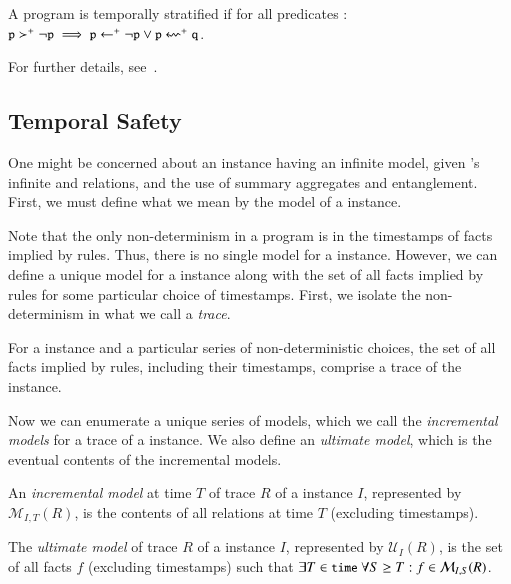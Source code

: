 \begin{definition}
%
A \lang program is temporally stratified if for all predicates :
$\dedalus{p} \succ^+ \lnot \dedalus{p} \implies \dedalus{p} \gets^+ \lnot
\dedalus{p} \lor \dedalus{p} \leftsquigarrow^+ \dedalus{q}$.
%
\end{definition}

For further details, see~\cite{dedalus-techr}.

\subsection{Temporal Safety}

One might be concerned about an instance having an infinite model, given \lang's
infinite  and  relations, and the use of
summary aggregates and entanglement.  First, we must define what we mean by the
model of a \lang instance.

Note that the only non-determinism in a \lang program is in the timestamps of
facts implied by  rules.  Thus, there is no single model for a
\lang instance.  However, we can define a unique model for a \lang instance
along with the set of all facts implied by  rules for some
particular choice of timestamps.  First, we isolate the non-determinism in what
we call a {\em trace}.

\begin{definition}
%
For a \lang instance and a particular series of non-deterministic choices, the
set of all facts implied by  rules, including their timestamps,
comprise a trace of the instance.
%
\end{definition}

Now we can enumerate a unique series of models, which we call the {\em incremental
models} for a trace of a \lang instance.  We also define an {\em ultimate
model}, which is the eventual contents of the incremental models.

\begin{definition}
%
An {\em incremental model} at time $T$ of trace $R$ of a \lang instance $I$,
represented by $\mathcal{M}_{I,T}(R)$, is the contents of all
relations at time $T$ (excluding timestamps).
%
\end{definition}

\begin{definition}
%
The {\em ultimate model} of trace $R$ of a \lang instance $I$, represented by
$\mathcal{U}_{I}(R)$, is the set of all facts $f$ (excluding timestamps) such
that $\exists T \in \dedalus{time}~\forall S \geq T: f \in
\mathcal{M}_{I,S}(R)$.
%
\end{definition}

